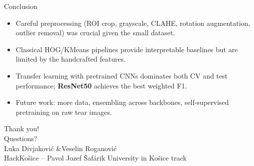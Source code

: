 \documentclass[aspectratio=169]{beamer}
\begin{document}
\begin{frame}{Conclusion}
    \begin{itemize}
        \item Careful preprocessing (ROI crop, grayscale, CLAHE, rotation augmentation,
              outlier removal) was crucial given the small dataset.
        \item Classical HOG/KMeans pipelines provide interpretable baselines
              but are limited by the handcrafted features.
        \item Transfer learning with pretrained CNNs dominates both CV and test
              performance; \textbf{ResNet50} achieves the best weighted F1.
        \item Future work: more data, ensembling across backbones, self-supervised
              pretraining on raw tear images.
    \end{itemize}
\end{frame}

\begin{frame}
    \vfill
    \centering
    {\Huge Thank you!}\\[1em]
    {\large Questions?}\\[2em]
    \small Luka Divjakovi\'c \quad\&\quad Veselin Roganovi\'c \\
    HackKošice -- Pavol Jozef Šafárik University in Košice track
    \vfill
\end{frame}
\end{document}
